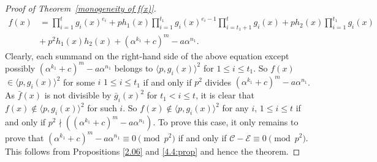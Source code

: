 \documentclass[10pt,a4paper]{amsart}
\newcommand{\calC}{\mathcal{C}}
\newcommand{\calE}{\mathcal{E}}
\begin{document}
\begin{proof}[Proof of Theorem~\ref{monogeneity of f(x)}]
	\begin{align*}
		f(x)&=\prod_{i=1}^{t}g_i(x)^{e_i}
+ph_1(x)\prod_{i=1}^{t_1}g_i(x)^{e_i-1}	\prod_{i=t_1+1}^{t}g_i(x)+ph_2(x)\prod_{i=1}^{t_1}g_i(x) \nonumber\\ &+~p^2h_1(x)h_2(x) + (\alpha^{k_1}+c)^m - a \alpha^{n_1}.
	\end{align*}
 Clearly, each summand on the right-hand side of the above equation except possibly $(\alpha^{k_1}+c)^m - a \alpha^{n_1}$ belongs to $\langle p, g_i(x) \rangle^2$  for $1\leq i\leq t_1$. So $f(x)$ $\in \langle p, g_i(x) \rangle^2$ for some $i$ $1\leq i\leq t_1$ if and only if $p^2$ divides $(\alpha^{k_1}+c)^m - a \alpha^{n_1}$. As $\bar f(x)$ is not divisible by $\bar g_i(x)^2$ for $t_1< i\leq t$, it is clear that $f(x)\not\in  \langle p, g_i(x) \rangle^2$ for such $i$. So $f(x)\not \in  \langle p, g_i(x) \rangle^2$ for any $i$, $1 \leq i \leq t$ if and only if $p^2\nmid ((\alpha^{k_1}+c)^m - a \alpha^{n_1})$. To prove this case, it only remains to prove that $(\alpha^{k_1}+c)^m - a \alpha^{n_1} \equiv 0 \pmod{p^2}$ if and only if $\calC - \calE \equiv 0\pmod{p^2}$. This follows from Propositions \ref{2.06} and \ref{4.4:prop} and hence the theorem.
\end{proof}
\end{document}

